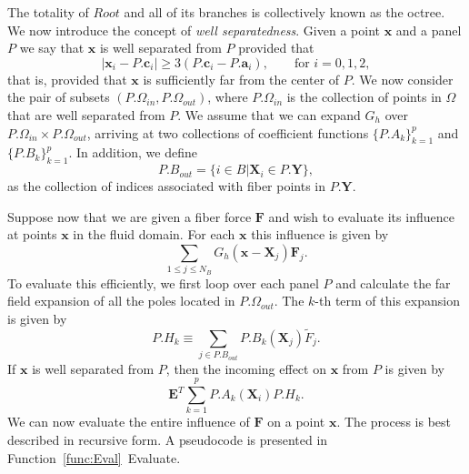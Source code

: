 \documentclass[preprint,12pt]{elsarticle}
\newcommand{\full}{\displaystyle}
\newcommand{\B}[1]{\mathbf{#1}}
\newcommand{\Panel}[1]{#1}
\begin{document}
The totality of $\Panel{Root}$ and all of its branches is collectively known as the octree. 
We now introduce the concept of \textit{well separatedness}. Given a point $\B{x}$ and a panel $\Panel{P}$ we say that $\B{x}$ is well separated from $\Panel{P}$ provided that 
\begin{equation}
|\B{x}_i - \Panel{P}.\B{c}_i| \geq 3(\Panel{P}.\B{c}_i - \Panel{P}.\B{a}_i), \qquad\text{for $i=0,1,2$}, \label{ws}
\end{equation}
that is, provided that $\B{x}$ is sufficiently far from the center of $\Panel{P}$. We now consider the pair of subsets $(\Panel{P}.\Omega_{in}, \Panel{P}.\Omega_{out})$, where $\Panel{P}.\Omega_{in}$ is the collection of points in $\Omega$ that are well separated from $\Panel{P}$. We assume that we can expand $G_h$ over $\Panel{P}.\Omega_{in}\times\Panel{P}.\Omega_{out}$, arriving at two collections of coefficient functions $\{\Panel{P}.A_k\}_{k=1}^p$ and $\{\Panel{P}.B_k\}_{k=1}^p$. In addition,  we define
\begin{equation}
\Panel{P}.B_{out} = \{i\in B | \B{X}_i\in\Panel{P}.\B{Y}\},
\end{equation}
as the collection of indices associated with fiber points in $\Panel{P}.\B{Y}$. 

Suppose now that we are given a fiber force $\B{F}$ and wish to evaluate its influence at points $\B{x}$ in the fluid domain. For each $\B{x}$ this influence is given by
\begin{equation}
\sum_{1\leq j\leq N_B} G_h(\B{x} - \B{X}_j) \B{F}_j.
\end{equation}
To evaluate this efficiently, we first loop over each panel $\Panel{P}$ and calculate the far field expansion of all the poles located in $\Panel{P}.\Omega_{out}$. The $k$-th term of this expansion is given by
\begin{equation}
\Panel{P}.H_k \equiv \sum_{j\in \Panel{P}.B_{out}}
\Panel{P}.B_k(\B{X}_j) \tilde{F}_j.
\label{eq:OutgoingA}
\end{equation}
If $\B{x}$ is well separated from $\Panel{P}$, then the incoming effect on $\B{x}$ from $\Panel{P}$ is given by
\begin{equation}
\B{E}^T \full\sum_{k=1}^{p}\Panel{P}.A_k(\B{X}_i)\Panel{P}.H_k.
\label{eq:IncomingA}
\end{equation}
We can now evaluate the entire influence of $\B{F}$ on a point $\B{x}$. The process is best described in recursive form. A pseudocode is presented in Function~\ref{func:Eval}~Evaluate. 
\end{document}
